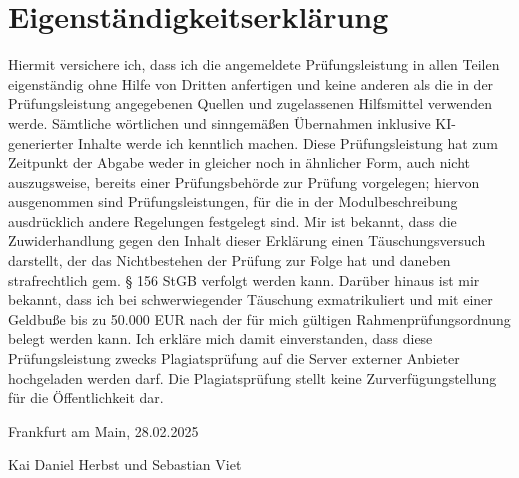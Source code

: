 \documentclass[12pt]{article}
\begin{document}
\begin{sloppypar}
    \listoffigures
    \newpage

    \listoftables
    \newpage

	\renewcommand{\contentsname}{Inhaltsverzeichnis}
	\tableofcontents

	\newpage
	\setcounter{page}{1}

	
	
	
	
	
	

	\printbibliography

    \newpage
    \section*{Eigenständigkeitserklärung}

    Hiermit versichere ich, dass ich die angemeldete Prüfungsleistung in allen
    Teilen eigenständig ohne Hilfe von Dritten anfertigen und keine anderen als
    die in der Prüfungsleistung angegebenen Quellen und zugelassenen Hilfsmittel
    verwenden werde. Sämtliche wörtlichen und sinngemäßen Übernahmen inklusive
    KI-generierter Inhalte werde ich kenntlich machen. Diese Prüfungsleistung
    hat zum Zeitpunkt der Abgabe weder in gleicher noch in ähnlicher Form, auch
    nicht auszugsweise, bereits einer Prüfungsbehörde zur Prüfung vorgelegen;
    hiervon ausgenommen sind Prüfungsleistungen, für die in der
    Modulbeschreibung ausdrücklich andere Regelungen festgelegt sind. Mir ist
    bekannt, dass die Zuwiderhandlung gegen den Inhalt dieser Erklärung einen
    Täuschungsversuch darstellt, der das Nichtbestehen der Prüfung zur Folge hat
    und daneben strafrechtlich gem. § 156 StGB verfolgt werden kann. Darüber
    hinaus ist mir bekannt, dass ich bei schwerwiegender Täuschung
    exmatrikuliert und mit einer Geldbuße bis zu 50.000 EUR nach der für mich
    gültigen Rahmenprüfungsordnung belegt werden kann. Ich erkläre mich damit
    einverstanden, dass diese Prüfungsleistung zwecks Plagiatsprüfung auf die
    Server externer Anbieter hochgeladen werden darf. Die Plagiatsprüfung stellt
    keine Zurverfügungstellung für die Öffentlichkeit dar.

    Frankfurt am Main, 28.02.2025

    Kai Daniel Herbst und Sebastian Viet

\end{sloppypar}
\end{document}
